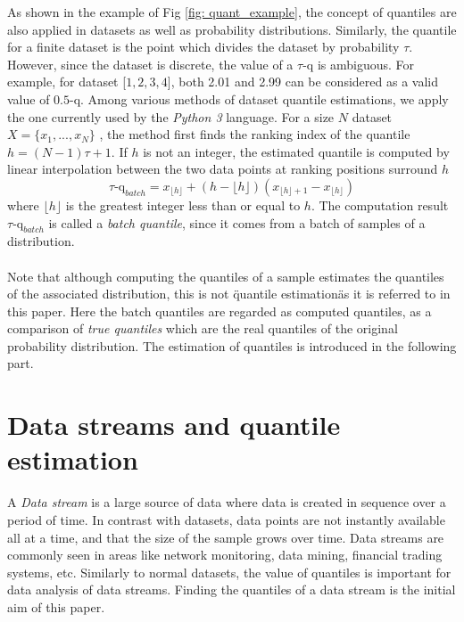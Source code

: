 As shown in the example of Fig \ref{fig: quant_example}, the concept of quantiles are also applied in datasets as well as probability distributions. Similarly, the quantile for a finite dataset is the point which divides the dataset by probability $\tau$. However, since the dataset is discrete, the value of a $\tau$-q is ambiguous. For example, for dataset [$1,2,3,4$], both 2.01 and 2.99 can be considered as a valid value of $0.5$-q. Among various methods of dataset quantile estimations, we apply the one currently used by the \textit{Python 3} language. For a size $N$ dataset $X = \{x_1, ..., x_N\}$ , the method first finds the ranking index of the quantile $h = (N-1)\tau + 1$. If $h$ is not an integer, the estimated quantile is computed by linear interpolation between the two data points at ranking positions surround $h$
\begin{equation}
    \tau \text{-q}_{batch} = x_{\lfloor h\rfloor}+(h-\lfloor h\rfloor)\left(x_{\lfloor h\rfloor+1}-x_{\lfloor h\rfloor}\right)
\end{equation}
where $\lfloor h\rfloor$ is the greatest integer less than or equal to $h$. The computation result $\tau \text{-q}_{batch}$ is called a \textit{batch quantile}, since it comes from a batch of samples of a distribution.
\\\\
Note that although computing the quantiles of a sample estimates the quantiles of the associated distribution, this is not \"quantile estimation\" as it is referred to in this paper. Here the batch quantiles are regarded as computed quantiles, as a comparison of \textit{true quantiles} which are the real quantiles of the original probability distribution. The estimation of quantiles is introduced in the following part.


\section{Data streams and quantile estimation}
\label{sec: intro_quant_est}

A \textit{Data stream} is a large source of data where data is created in sequence over a period of time. In contrast with datasets, data points are not instantly available all at a time, and that the size of the sample grows over time. Data streams are commonly seen in areas like network monitoring, data mining, financial trading systems, etc. Similarly to normal datasets, the value of quantiles is important for data analysis of data streams. Finding the quantiles of a data stream is the initial aim of this paper.

